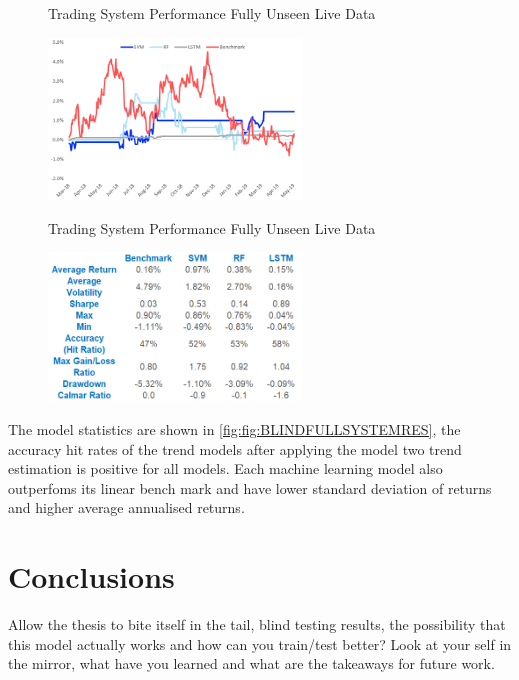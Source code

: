 \documentclass[11pt]{article}
\begin{document}
\begin{figure}[h]
    \centering
	\caption{Trading System Performance Fully Unseen Live Data}    
	\includegraphics[width=0.6\textwidth]{BLINDFULLSYSTEMRES}
    \label{fig:BLINDFULLSYSTEMRES}
     \caption*{}
\end{figure}


\begin{figure}[h]
    \centering
	\caption{Trading System Performance Fully Unseen Live Data}    
	\includegraphics[width=0.6\textwidth]{BLINDFULLSYSTEMRES_stats}
    \label{fig:BLINDFULLSYSTEMRES_stats}
     \caption*{}
\end{figure}

The model statistics are shown in \ref{fig:fig:BLINDFULLSYSTEMRES}, the accuracy hit rates of the trend models after applying the model two trend estimation is positive for all models. Each machine learning model also outperfoms its linear bench mark and have lower standard deviation of returns and higher average annualised returns.

\clearpage



\section{Conclusions} \label{conclusions}
Allow the thesis to bite itself in the tail, blind testing results, the possibility that this model actually works and how can you train/test better? Look at your self in the mirror, what have you learned and what are the takeaways for future work.
\end{document}

